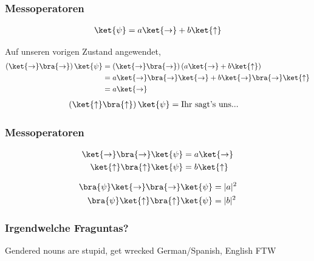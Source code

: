 \documentclass{beamer}
\begin{document}
\begin{frame}
\frametitle{Messoperatoren}
\begin{align*}
\ket{\psi} = a\ket{\rightarrow} + b\ket{\uparrow}
\end{align*}

\bigskip
Auf unseren vorigen Zustand angewendet,
\begin{align*}
    \left(\ket{\rightarrow}\bra{\rightarrow}\right) \ket{\psi}
    &=
    \left(\ket{\rightarrow}\bra{\rightarrow}\right)
    \left(a\ket{\to} + b\ket{\uparrow}\right) \\
    &= a\ket{\rightarrow}\bra{\rightarrow}\ket{\rightarrow} + b\ket{\rightarrow}\bra{\rightarrow}\ket{\uparrow} \\
    &= a\ket{\rightarrow}
\end{align*}
\begin{align*}
    \left(\ket{\uparrow}\bra{\uparrow}\right) \ket{\psi} &= \text{Ihr sagt's uns...}
\end{align*}
\end{frame}

\begin{frame}
\frametitle{Messoperatoren}
\begin{align*}
    \ket{\rightarrow}\bra{\rightarrow} \ket{\psi}
    &= a\ket{\rightarrow} \\
    \ket{\uparrow}\bra{\uparrow} \ket{\psi} &= b\ket{\uparrow}
\end{align*}

\begin{align*}
    \bra{\psi}\ket{\rightarrow}\bra{\rightarrow} \ket{\psi}
    &= |a|^2 \\
    \bra{\psi}\ket{\uparrow}\bra{\uparrow} \ket{\psi} &= |b|^2
\end{align*}
\end{frame}

\begin{frame}
\frametitle{\textquestiondown Irgendwelche Fraguntas?}
Gendered nouns are stupid, get wrecked German/Spanish, English FTW
\end{frame}
\end{document}
